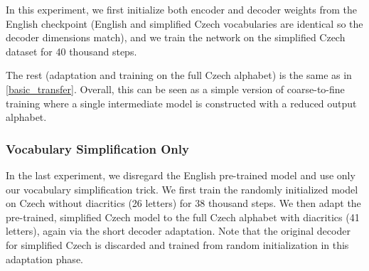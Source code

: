 In this experiment, we first initialize both encoder and decoder weights from the English checkpoint (English and simplified Czech vocabularies are identical so the decoder dimensions match), and we train the network on the simplified Czech dataset for 40 thousand steps.

The rest (adaptation and training on the full Czech alphabet)
is the same as in \cref{basic_transfer}.
%
Overall, this can be seen as a simple version of coarse-to-fine training where a single intermediate model is constructed with a reduced output alphabet.

\subsubsection{Vocabulary Simplification Only}
\label{sub_sec:simplification}





In the last experiment, we disregard the English pre-trained model and use only our vocabulary simplification trick. We first train the randomly initialized model on Czech without diacritics (26 letters) for 38 thousand steps. We then adapt the pre-trained, simplified Czech model to the full Czech alphabet with diacritics (41 letters), again via the short decoder adaptation. Note that the original decoder for simplified Czech is discarded and trained from random initialization in this adaptation phase.




